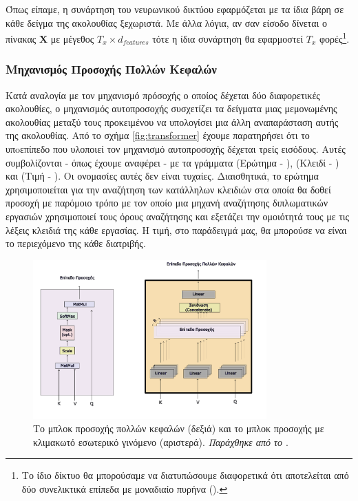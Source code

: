 Όπως είπαμε, η συνάρτηση του νευρωνικού δικτύου εφαρμόζεται με τα ίδια βάρη σε κάθε δείγμα της ακολουθίας ξεχωριστά. Με άλλα λόγια, αν σαν είσοδο δίνεται ο πίνακας $\boldsymbol{X}$ με μέγεθος $T_x \times d_{features}$ τότε η ίδια συνάρτηση θα εφαρμοστεί $T_x$ φορές\footnote{Το ίδιο δίκτυο θα μπορούσαμε να διατυπώσουμε διαφορετικά ότι αποτελείται από δύο συνελικτικά επίπεδα με μοναδιαίο πυρήνα ().}. \par

\subsubsection{Μηχανισμός Προσοχής Πολλών Κεφαλών}
Κατά αναλογία με τον μηχανισμό πρόσοχής ο οποίος δέχεται δύο διαφορετικές ακολουθίες, ο μηχανισμός αυτο\textendash προσοχής συσχετίζει τα δείγματα μιας μεμονωμένης ακολουθίας μεταξύ τους προκειμένου να υπολογίσει μια άλλη αναπαράσταση αυτής της ακολουθίας. 
Από το σχήμα \ref{fig:transformer} έχουμε παρατηρήσει ότι το υπoεπίπεδο που υλοποιεί τον μηχανισμό αυτοπροσοχής δέχεται τρείς εισόδους. Αυτές συμβολίζονται - όπως έχουμε αναφέρει - με τα γράμματα  (Ερώτημα - ),  (Κλειδί - ) και  (Τιμή - ). Οι ονομασίες αυτές δεν είναι τυχαίες. Διαισθητικά, το ερώτημα χρησιμοποιείται για την αναζήτηση των κατάλληλων κλειδιών στα οποία θα δοθεί προσοχή με παρόμοιο τρόπο με τον οποίο μια μηχανή αναζήτησης διπλωματικών εργασιών χρησιμοποιεί τους όρους αναζήτησης και εξετάζει την ομοιότητά τους με τις λέξεις κλειδιά της κάθε εργασίας. Η τιμή, στο παράδειγμά μας, θα μπορούσε να είναι το περιεχόμενο της κάθε διατριβής. \par

\begin{figure}[h]
  \centering
  \includegraphics[width=0.8\textwidth]{images/chapter theoritical background/transformer_attention_gr.pdf}
  \caption{Το μπλοκ προσοχής πολλών κεφαλών (δεξιά) και το μπλοκ προσοχής με κλιμακωτό εσωτερικό γινόμενο (αριστερά). \textit{Παράχθηκε από το \href{https://inkscape.org/}{}}.}
  \label{fig:transformer_multi_head}
\end{figure}

